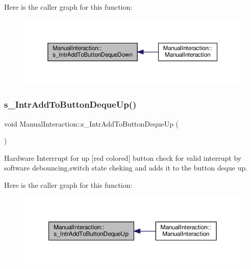Here is the caller graph for this function\+:
\nopagebreak
\begin{figure}[H]
\begin{center}
\leavevmode
\includegraphics[width=350pt]{classManualInteraction_a9a6c72bc26699b16fc328bcacde931fb_icgraph}
\end{center}
\end{figure}
\mbox{\label{classManualInteraction_ad040212df8364f6e9ef9462055b1da3f}} 
\subsubsection{\texorpdfstring{s\+\_\+\+Intr\+Add\+To\+Button\+Deque\+Up()}{s\_IntrAddToButtonDequeUp()}}
{\footnotesize\ttfamily void Manual\+Interaction\+::s\+\_\+\+Intr\+Add\+To\+Button\+Deque\+Up (\begin{DoxyParamCaption}{ }\end{DoxyParamCaption})\hspace{0.3cm}{\ttfamily [static]}}



Hardware Interrrupt for up \mbox{[}red colored\mbox{]} button check for valid interrupt by software debouncing,switch state cheking and adds it to the button deque up. 

Here is the caller graph for this function\+:
\nopagebreak
\begin{figure}[H]
\begin{center}
\leavevmode
\includegraphics[width=350pt]{classManualInteraction_ad040212df8364f6e9ef9462055b1da3f_icgraph}
\end{center}
\end{figure}
\mbox{\label{classManualInteraction_afce55b16a04782daf03a62477d3120ba}} 
